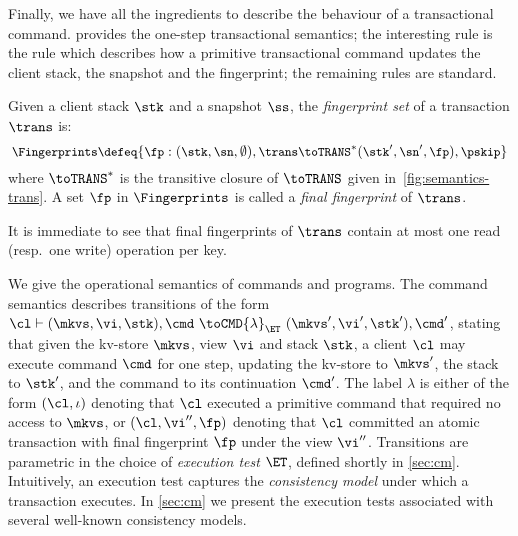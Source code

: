 Finally, we have all the ingredients to describe the behaviour of a transactional command.   provides the one-step transactional semantics; 
the interesting rule is the  rule which describes how a primitive transactional command updates the client stack, the snapshot and the fingerprint; 
the remaining rules are standard.



\begin{definition}
Given a client stack $\stk$ and a snapshot $\ss$, the \emph{fingerprint set} of a transaction $\trans$ is:
%
{
\[
\small
\Fingerprints \defeq \{\fp : (\stk, \sn, \emptyset), \trans \toTRANS^* (\stk', \sn', \fp), \pskip \}
\]%
}%
%
where $\toTRANS^*$ is the transitive closure of $\toTRANS$ given in~\cref{fig:semantics-trans}.  
A set $\fp$ in $\Fingerprints$ is called a \emph{final fingerprint} of $\trans$. 
\end{definition}
\noindent It is immediate to see that final fingerprints of $\trans$ contain at most one read (resp.\ one write) operation per key.

We give the operational semantics of commands and programs. 
The command semantics describes transitions of the form
$\cl \vdash (\mkvs, \vi, \stk), \cmd \ \toCMD{\lambda}_{\ET} \ (\mkvs', \vi', \stk') ,
\cmd'$, stating that given the kv-store $\mkvs$, view $\vi$ and stack $\stk$, 
a client $\cl$ may execute command $\cmd$ for one step, updating 
the kv-store to $\mkvs'$, the stack to $\stk'$, and the command to its continuation $\cmd'$.
The label $\lambda$ is either of the form $(\cl, \iota)$ denoting that $\cl$ executed a primitive command
that required no access to $\mkvs$, 
or $(\cl, \vi'', \fp)$ denoting that $\cl$ committed an atomic transaction with final fingerprint $\fp$ under the view $\vi''$.
Transitions are parametric in the choice of \emph{execution test} $\ET$, defined shortly in \cref{sec:cm}.
Intuitively, an execution test captures the \emph{consistency model} under which a transaction executes.
In \cref{sec:cm} we present the execution tests associated with several well-known consistency models.  %

